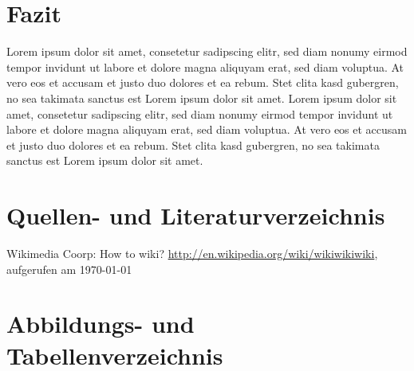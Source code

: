 \documentclass[11pt,a4paper,titlepage,ngerman]{article}
\begin{document}
\section{Fazit}

Lorem ipsum dolor sit amet, consetetur sadipscing elitr, sed diam nonumy eirmod tempor invidunt ut labore et dolore magna aliquyam erat, sed diam voluptua. At vero eos et accusam et justo duo dolores et ea rebum. Stet clita kasd gubergren, no sea takimata sanctus est Lorem ipsum dolor sit amet. Lorem ipsum dolor sit amet, consetetur sadipscing elitr, sed diam nonumy eirmod tempor invidunt ut labore et dolore magna aliquyam erat, sed diam voluptua. At vero eos et accusam et justo duo dolores et ea rebum. Stet clita kasd gubergren, no sea takimata sanctus est Lorem ipsum dolor sit amet.

\newpage

\section{Quellen- und Literaturverzeichnis}

\begin{thebibliography}{999}
 Wikimedia Coorp: \glqq How to wiki?\grqq{} \url{http://en.wikipedia.org/wiki/wikiwikiwiki}, aufgerufen am \today{}
\end{thebibliography}

\section{Abbildungs- und Tabellenverzeichnis}

\renewcommand{\listfigurename}{Verzeichnis der Abbildungen}
\listoffigures

\newpage

\printglossary
\end{document}

